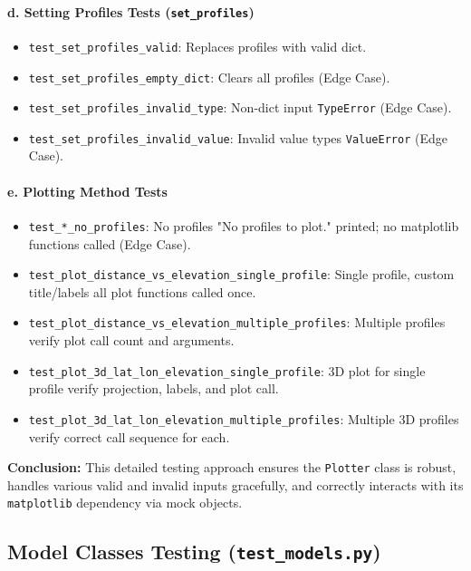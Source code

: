 \documentclass[12pt]{article}
\begin{document}
\paragraph{d. Setting Profiles Tests (\texttt{set\_profiles})}
\begin{itemize}
  \item \texttt{test\_set\_profiles\_valid}: Replaces profiles with valid dict.
  \item \texttt{test\_set\_profiles\_empty\_dict}: Clears all profiles (Edge Case).
  \item \texttt{test\_set\_profiles\_invalid\_type}: Non-dict input \textrightarrow{} \texttt{TypeError} (Edge Case).
  \item \texttt{test\_set\_profiles\_invalid\_value}: Invalid value types \textrightarrow{} \texttt{ValueError} (Edge Case).
\end{itemize}

\paragraph{e. Plotting Method Tests}
\begin{itemize}
  \item \texttt{test\_*\_no\_profiles}: No profiles \textrightarrow{} "No profiles to plot." printed; no matplotlib functions called (Edge Case).
  \item \texttt{test\_plot\_distance\_vs\_elevation\_single\_profile}: Single profile, custom title/labels \textrightarrow{} all plot functions called once.
  \item \texttt{test\_plot\_distance\_vs\_elevation\_multiple\_profiles}: Multiple profiles \textrightarrow{} verify plot call count and arguments.
  \item \texttt{test\_plot\_3d\_lat\_lon\_elevation\_single\_profile}: 3D plot for single profile \textrightarrow{} verify projection, labels, and plot call.
  \item \texttt{test\_plot\_3d\_lat\_lon\_elevation\_multiple\_profiles}: Multiple 3D profiles \textrightarrow{} verify correct call sequence for each.
\end{itemize}

\textbf{Conclusion:} This detailed testing approach ensures the \texttt{Plotter} class is robust, handles various valid and invalid inputs gracefully, and correctly interacts with its \texttt{matplotlib} dependency via mock objects.


\subsection{Model Classes Testing (\texttt{test\_models.py})}
\end{document}
